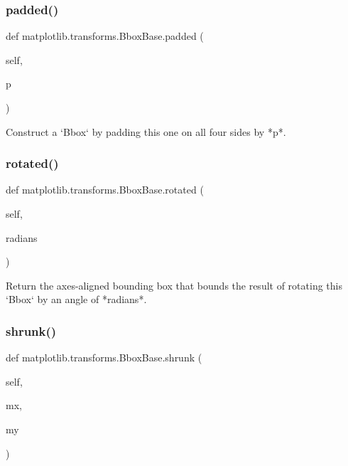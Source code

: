 \subsubsection{\texorpdfstring{padded()}{padded()}}
{\footnotesize\ttfamily def matplotlib.\+transforms.\+Bbox\+Base.\+padded (\begin{DoxyParamCaption}\item[{}]{self,  }\item[{}]{p }\end{DoxyParamCaption})}

\begin{DoxyVerb}Construct a `Bbox` by padding this one on all four sides by *p*.\end{DoxyVerb}
 \mbox{\label{classmatplotlib_1_1transforms_1_1BboxBase_a31786df343c2ef286149c861c4062dea}} 
\subsubsection{\texorpdfstring{rotated()}{rotated()}}
{\footnotesize\ttfamily def matplotlib.\+transforms.\+Bbox\+Base.\+rotated (\begin{DoxyParamCaption}\item[{}]{self,  }\item[{}]{radians }\end{DoxyParamCaption})}

\begin{DoxyVerb}Return the axes-aligned bounding box that bounds the result of rotating
this `Bbox` by an angle of *radians*.
\end{DoxyVerb}
 \mbox{\label{classmatplotlib_1_1transforms_1_1BboxBase_ac58f91fa89823abe30d1c8ea972a18fe}} 
\subsubsection{\texorpdfstring{shrunk()}{shrunk()}}
{\footnotesize\ttfamily def matplotlib.\+transforms.\+Bbox\+Base.\+shrunk (\begin{DoxyParamCaption}\item[{}]{self,  }\item[{}]{mx,  }\item[{}]{my }\end{DoxyParamCaption})}

